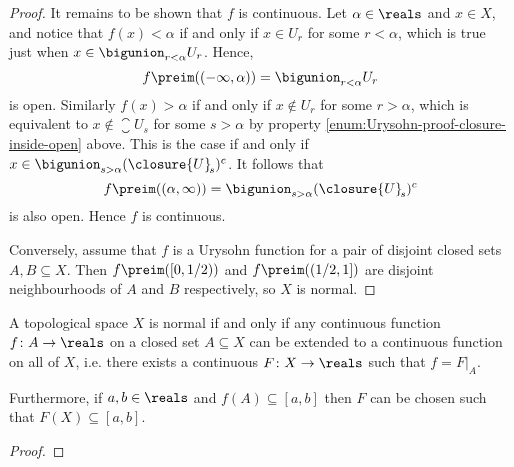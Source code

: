 \documentclass[article, a4paper, 11pt, oneside]{memoir}
\numberwithin{equation}{chapter}
\begin{document}
\begin{proof}
    It remains to be shown that $f$ is continuous. Let $\alpha \in \reals$ and $x \in X$, and notice that $f(x) < \alpha$ if and only if $x \in U_r$ for some $r < \alpha$, which is true just when $x \in \bigunion_{r < \alpha} U_r$. Hence,
    \begin{equation*}
        f\preim((-\infty,\alpha))
            = \bigunion_{r < \alpha} U_r
    \end{equation*}
    is open. Similarly $f(x) > \alpha$ if and only if $x \not\in U_r$ for some $r > \alpha$, which is equivalent to $x \not\in \closure{U}_{\!s}$ for some $s > \alpha$ by property \cref{enum:Urysohn-proof-closure-inside-open} above. This is the case if and only if $x \in \bigunion_{s > \alpha} (\closure{U}_{\!s})^c$. It follows that
    \begin{equation*}
        f\preim((\alpha,\infty))
            = \bigunion_{s > \alpha} (\closure{U}_{\!s})^c
    \end{equation*}
    is also open. Hence $f$ is continuous.

    Conversely, assume that $f$ is a Urysohn function for a pair of disjoint closed sets $A,B \subseteq X$. Then $f\preim([0,1/2))$ and $f\preim((1/2,1])$ are disjoint neighbourhoods of $A$ and $B$ respectively, so $X$ is normal.
\end{proof}


\begin{theorem}
    \label{thm:Tietze-extension}
    A topological space $X$ is normal if and only if any continuous function $f \colon A \to \reals$ on a closed set $A \subseteq X$ can be extended to a continuous function on all of $X$, i.e. there exists a continuous $F \colon X \to \reals$ such that $f = F|_A$.

    Furthermore, if $a,b \in \reals$ and $f(A) \subseteq [a,b]$ then $F$ can be chosen such that $F(X) \subseteq [a,b]$.
\end{theorem}

\begin{proof}
    
\end{proof}


\nocite{*}

\printbibliography
\end{document}

